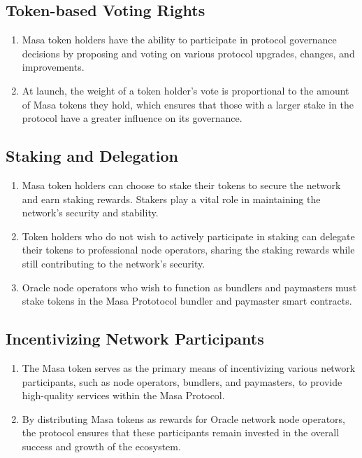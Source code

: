 \documentclass{article}
\begin{document}
\subsection{Token-based Voting Rights}
\begin{enumerate}
\item Masa token holders have the ability to participate in protocol governance decisions by proposing and voting on various protocol upgrades, changes, and improvements. 
\item At launch, the weight of a token holder's vote is proportional to the amount of Masa tokens they hold, which ensures that those with a larger stake in the protocol have a greater influence on its governance. 
\end{enumerate}
\subsection{Staking and Delegation}
\begin{enumerate}
\item Masa token holders can choose to stake their tokens to secure the network and earn staking rewards. Stakers play a vital role in maintaining the network's security and stability.
\item Token holders who do not wish to actively participate in staking can delegate their tokens to professional node operators, sharing the staking rewards while still contributing to the network's security.
\item Oracle node operators who wish to function as bundlers and paymasters must stake tokens in the Masa Prototocol bundler and paymaster smart contracts.
\end{enumerate}
\subsection{Incentivizing Network Participants}
\begin{enumerate}
\item The Masa token serves as the primary means of incentivizing various network participants, such as node operators, bundlers, and paymasters, to provide high-quality services within the Masa Protocol.
\item By distributing Masa tokens as rewards for Oracle network node operators, the protocol ensures that these participants remain invested in the overall success and growth of the ecosystem.
\end{enumerate}
\end{document}
